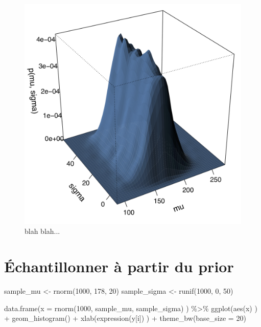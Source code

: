 \documentclass[
  a4paper,11pt,twoside,onecolumn,openright,final,oldfontcommands]{memoir}
\newenvironment{Shaded}{\begin{snugshade}}{\end{snugshade}}
\newcommand{\AttributeTok}[1]{\textcolor[rgb]{0.77,0.63,0.00}{#1}}
\newcommand{\DecValTok}[1]{\textcolor[rgb]{0.00,0.00,0.81}{#1}}
\newcommand{\FunctionTok}[1]{\textcolor[rgb]{0.00,0.00,0.00}{#1}}
\newcommand{\NormalTok}[1]{#1}
\newcommand{\OtherTok}[1]{\textcolor[rgb]{0.56,0.35,0.01}{#1}}
\newcommand{\SpecialCharTok}[1]{\textcolor[rgb]{0.00,0.00,0.00}{#1}}
\theoremstyle{definition}
\theoremstyle{definition}
\theoremstyle{definition}
\theoremstyle{definition}
\theoremstyle{remark}
\begin{document}
\begin{figure}[!htb]

{\centering \includegraphics[width=0.75\linewidth]{figures/prior} 

}

\caption{blah blah...}\label{fig:plot-prior-2d-knitr}
\end{figure}

\hypertarget{uxe9chantillonner-uxe0-partir-du-prior}{%
\section{Échantillonner à partir du prior}\label{uxe9chantillonner-uxe0-partir-du-prior}}

\begin{Shaded}
\begin{Highlighting}[]
\NormalTok{sample\_mu }\OtherTok{\textless{}{-}} \FunctionTok{rnorm}\NormalTok{(}\DecValTok{1000}\NormalTok{, }\DecValTok{178}\NormalTok{, }\DecValTok{20}\NormalTok{)}
\NormalTok{sample\_sigma }\OtherTok{\textless{}{-}} \FunctionTok{runif}\NormalTok{(}\DecValTok{1000}\NormalTok{, }\DecValTok{0}\NormalTok{, }\DecValTok{50}\NormalTok{)}

\FunctionTok{data.frame}\NormalTok{(}\AttributeTok{x =} \FunctionTok{rnorm}\NormalTok{(}\DecValTok{1000}\NormalTok{, sample\_mu, sample\_sigma) ) }\SpecialCharTok{\%\textgreater{}\%}
    \FunctionTok{ggplot}\NormalTok{(}\FunctionTok{aes}\NormalTok{(x) ) }\SpecialCharTok{+}
    \FunctionTok{geom\_histogram}\NormalTok{() }\SpecialCharTok{+}
    \FunctionTok{xlab}\NormalTok{(}\FunctionTok{expression}\NormalTok{(y[i]) ) }\SpecialCharTok{+}
    \FunctionTok{theme\_bw}\NormalTok{(}\AttributeTok{base\_size =} \DecValTok{20}\NormalTok{)}
\end{Highlighting}
\end{Shaded}
\end{document}
